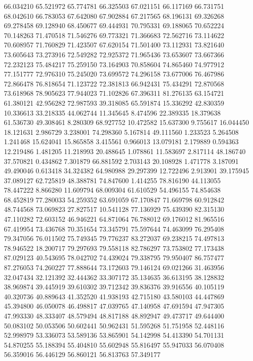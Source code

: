 66.034210
65.521972
65.774781
66.325503
67.021151
66.117169
66.731751
68.042610
66.783053
67.642080
67.902884
67.217565
68.196131
69.326268
69.278458
69.128940
68.450677
69.444931
70.795331
69.188065
70.652224
70.148263
71.470518
71.546276
69.773321
71.366683
72.562716
73.114622
70.608957
71.760829
71.423507
67.620154
71.501400
73.112931
73.821640
73.605643
73.273916
72.549282
72.925372
71.965436
73.653607
73.667366
72.232123
75.484217
75.259150
73.164903
70.858604
74.865460
74.977912
77.151777
72.976310
75.245020
73.699572
74.296158
73.677006
76.467986
72.866478
76.818654
71.123722
72.381813
66.942431
75.434291
72.870568
73.618968
78.905623
77.944023
71.102826
67.396311
81.276135
63.154721
61.380121
42.956282
72.987593
39.318085
65.591874
15.336292
42.830359
10.336613
33.218335
44.062744
11.345645
8.474596
22.389335
18.379638
61.536730
49.308461
8.280309
68.927752
10.472582
15.637300
9.755617
16.044450
18.121631
2.986729
3.238001
74.298360
5.167814
49.111560
1.233523
5.264508
1.241468
15.624041
15.865858
3.415561
0.966013
13.079181
2.179889
0.594363
12.219486
1.481205
11.218993
20.488645
1.078861
11.583697
2.817114
48.186740
37.570821
0.434862
7.301879
66.881592
2.703143
20.108928
1.471778
3.187091
49.490046
0.613418
34.324382
64.980988
29.297399
12.722496
2.913901
39.175945
37.089127
62.725819
48.388781
74.847600
1.414255
78.816190
44.113055
78.447222
8.866280
11.609794
68.009304
61.610529
54.496155
74.854638
68.452819
77.280033
54.259352
63.691059
67.170847
71.669798
60.912842
48.744568
73.069823
27.827517
10.541128
77.136929
75.439390
82.315130
47.110282
72.603152
46.946221
64.871064
76.788012
69.176012
81.965516
67.419954
73.436768
70.351654
73.345791
75.597644
74.463099
76.295408
79.347056
76.011502
75.749345
79.776237
83.272037
69.238215
74.497813
78.946522
18.200717
79.297693
79.558118
82.786297
73.753802
77.173438
87.029123
40.543695
78.042702
74.439024
79.338795
79.950407
86.757477
87.276053
74.260227
77.888644
73.172603
79.146124
69.021266
31.463956
32.047434
32.121392
32.444362
33.307172
35.134635
36.613195
38.128832
38.969874
39.445919
39.610302
39.712342
39.836376
39.916556
40.105119
40.320736
40.889643
41.352520
41.938193
42.715180
43.580103
44.447869
45.394800
46.050078
46.498817
47.039765
47.140958
47.691594
47.947305
47.993330
48.333407
48.579494
48.817188
48.892947
49.473717
49.644400
50.083102
50.053506
50.602441
50.962431
51.595268
51.751958
52.448116
52.998979
53.336073
53.589136
53.865901
54.142998
54.413390
54.701131
54.870255
55.188394
55.404810
55.602948
55.816497
55.947033
56.070408
56.359016
56.446129
56.860121
56.813763
57.349177
